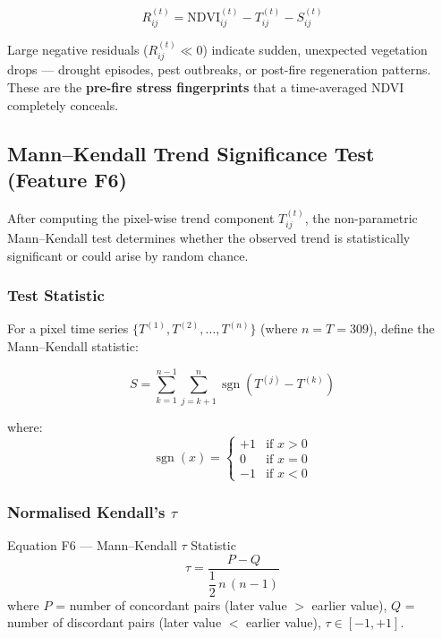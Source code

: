\documentclass[12pt, a4paper]{article}
\begin{document}
\begin{equation}
  R_{ij}^{(t)} =
  \mathrm{NDVI}_{ij}^{(t)} - T_{ij}^{(t)} - S_{ij}^{(t)}
  \label{eq:residual}
\end{equation}

Large negative residuals ($R_{ij}^{(t)} \ll 0$) indicate sudden,
unexpected vegetation drops --- drought episodes, pest outbreaks,
or post-fire regeneration patterns.
These are the \textbf{pre-fire stress fingerprints} that a
time-averaged NDVI completely conceals.

\subsection{Mann--Kendall Trend Significance Test (Feature F6)}

After computing the pixel-wise trend component $T_{ij}^{(t)}$,
the non-parametric Mann--Kendall test \citep{mann1945,kendall1975}
determines whether the observed trend is statistically significant
or could arise by random chance.

\subsubsection{Test Statistic}

For a pixel time series $\{T^{(1)}, T^{(2)}, \ldots, T^{(n)}\}$
(where $n = T = 309$), define the Mann--Kendall statistic:

\begin{equation}
  S = \sum_{k=1}^{n-1} \sum_{j=k+1}^{n}
  \operatorname{sgn}\!\left(T^{(j)} - T^{(k)}\right)
  \label{eq:mk_S}
\end{equation}

where:
\begin{equation}
  \operatorname{sgn}(x) =
  \begin{cases}
    +1 & \text{if } x > 0 \\
     0 & \text{if } x = 0 \\
    -1 & \text{if } x < 0
  \end{cases}
  \label{eq:sgn}
\end{equation}

\subsubsection{Normalised Kendall's $\tau$}

\begin{mathbox}{Equation F6 — Mann--Kendall $\tau$ Statistic}
\begin{equation}
  \tau = \frac{P - Q}{\dfrac{1}{2}\,n\,(n-1)}
  \label{eq:mk_tau}
\end{equation}
where $P$ = number of concordant pairs (later value $>$ earlier value),
$Q$ = number of discordant pairs (later value $<$ earlier value),
$\tau \in [-1, +1]$.
\end{mathbox}
\end{document}
